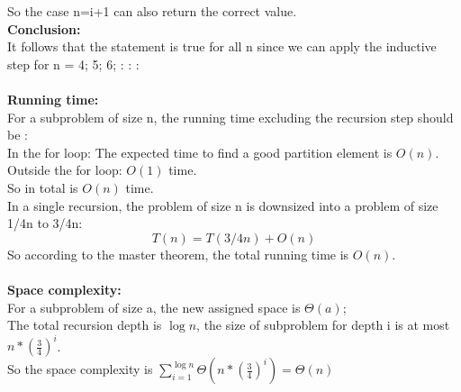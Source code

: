\documentclass{article}
\begin{document}
So the case n=i+1 can also return the correct value.\\
\textbf{Conclusion:}\\
It follows that the statement is true for all n since we can apply the inductive step for n = 4; 5; 6; : : :\\\\
\noindent\textbf{\large Running time:}\\
For a subproblem of size n, the running time excluding the recursion step should be :\\
In the for loop: The expected time to find a good partition element is $O(n)$.\\
Outside the for loop: $O(1)$ time.\\
So in total is $O(n)$ time.\\
In a single recursion, the problem of size n is downsized into a problem of size 1/4n to 3/4n:
$$T(n) = T(3/4n)+O(n)$$
So according to the master theorem, the total running time is $O(n)$.\\\\
\noindent\textbf{\large Space complexity:}\\
For a subproblem of size a, the new assigned space is $\Theta(a)$;\\
The total recursion depth is $\log n $, the size of subproblem for depth i is at most $n*{(\frac{3}{4})}^i$.\\
So the space complexity is $\sum_{i=1}^{\log n} \Theta(n*{(\frac{3}{4})}^i) = \Theta(n)$
\end{document}
